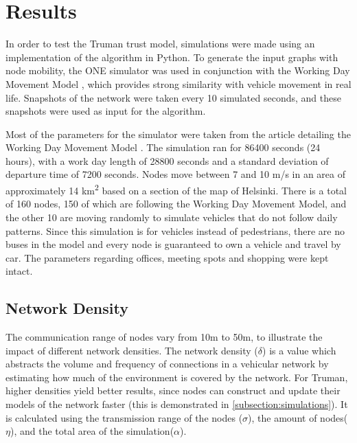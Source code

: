 \documentclass[conference]{IEEEtran}
\begin{document}
\section{Results}
\label{section:results}

In order to test the Truman trust model, simulations were made using an implementation of the algorithm in Python.
To generate the input graphs with node mobility, the ONE simulator \cite{keranen2009one} was used in conjunction with the Working Day Movement Model \cite{ekman2008working}, which provides strong similarity with vehicle movement in real life.
Snapshots of the network were taken every 10 simulated seconds, and these snapshots were used as input for the algorithm.

Most of the parameters for the simulator were taken from the article detailing the Working Day Movement Model \cite{ekman2008working}.
The simulation ran for 86400 seconds (24 hours), with a work day length of 28800 seconds and a standard deviation of departure time of 7200 seconds.
Nodes move between 7 and 10 m/s in an area of approximately 14 km\textsuperscript{2} based on a section of the map of Helsinki.
There is a total of 160 nodes, 150 of which are following the Working Day Movement Model, and the other 10 are moving randomly to simulate vehicles that do not follow daily patterns.
Since this simulation is for vehicles instead of pedestrians, there are no buses in the model and every node is guaranteed to own a vehicle and travel by car.
The parameters regarding offices, meeting spots and shopping were kept intact.

\subsection{Network Density}


The communication range of nodes vary from 10m to 50m, to illustrate the impact of different network densities.
The network density ($\delta$) is a value which abstracts the volume and frequency of connections in a vehicular network by estimating how much of the environment is covered by the network.
For Truman, higher densities yield better results, since nodes can construct and update their models of the network faster (this is demonstrated in \autoref{subsection:simulations}).
It is calculated using the transmission range of the nodes ($\sigma$), the amount of nodes($\eta$), and the total area of the simulation($\alpha$).
\end{document}
